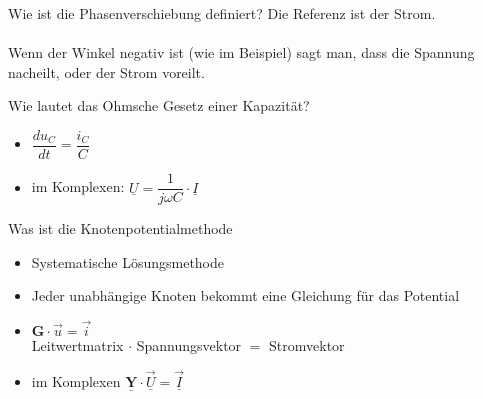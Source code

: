 \begin{karte}{Wie ist die Phasenverschiebung definiert?}
	Die Referenz ist der Strom.\\
	\\
	Wenn der Winkel negativ ist (wie im Beispiel) sagt man, dass die Spannung nacheilt, oder der Strom voreilt.
\end{karte}

\begin{karte}{Wie lautet das Ohmsche Gesetz einer Kapazität?}
	\begin{itemize}
		\item $\dfrac{du_{C}}{dt}=\dfrac{i_{C}}{C}$
		\item im Komplexen: $\underline{U} = \dfrac{1}{j \omega C} \cdot \underline{I}$
	\end{itemize}
\end{karte}

\begin{karte}{Was ist die Knotenpotentialmethode}
	\begin{itemize}
		\item Systematische Lösungsmethode
		\item Jeder unabhängige Knoten bekommt eine Gleichung für das Potential
		\item $\mathbf{G} \cdot \vec{u} = \vec{i}$\\
		Leitwertmatrix $\cdot$ Spannungsvektor $=$ Stromvektor
		\item im Komplexen 
		$\mathbf{\underline{Y}} \cdot \underline{\vec{U}} = \underline{\vec{I}}$
	\end{itemize}
\end{karte}